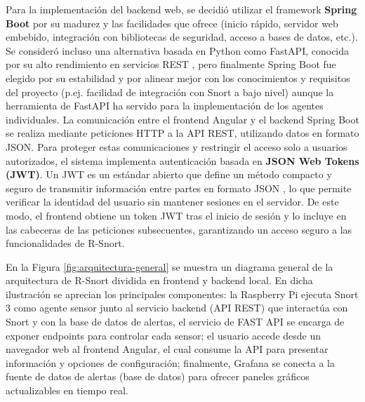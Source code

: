 \documentclass[11pt,a4paper,twoside]{report}
\begin{document}
Para la implementación del backend web, se decidió utilizar el framework \textbf{Spring Boot} por su madurez y las facilidades que ofrece (inicio rápido, servidor web embebido, integración con bibliotecas de seguridad, acceso a bases de datos, etc.). Se consideró incluso una alternativa basada en Python como FastAPI, conocida por su alto rendimiento en servicios REST \cite{FastAPI}, pero finalmente Spring Boot fue elegido por su estabilidad y por alinear mejor con los conocimientos y requisitos del proyecto (p.ej. facilidad de integración con Snort a bajo nivel) aunque la herramienta de FastAPI ha servido para la implementación de los agentes individuales. La comunicación entre el frontend Angular y el backend Spring Boot se realiza mediante peticiones HTTP a la API REST, utilizando datos en formato JSON. Para proteger estas comunicaciones y restringir el acceso solo a usuarios autorizados, el sistema implementa autenticación basada en \textbf{JSON Web Tokens (JWT)}. Un JWT es un estándar abierto que define un método compacto y seguro de transmitir información entre partes en formato JSON \cite{JWT}, lo que permite verificar la identidad del usuario sin mantener sesiones en el servidor. De este modo, el frontend obtiene un token JWT tras el inicio de sesión y lo incluye en las cabeceras de las peticiones subsecuentes, garantizando un acceso seguro a las funcionalidades de R-Snort.\newline

En la Figura \ref{fig:arquitectura-general} se muestra un diagrama general de la arquitectura de R-Snort dividida en frontend y backend local. En dicha ilustración se aprecian los principales componentes: la Raspberry Pi ejecuta Snort 3 como agente sensor junto al servicio backend (API REST) que interactúa con Snort y con la base de datos de alertas, el servicio de FAST API se encarga de exponer endpoints para controlar cada sensor; el usuario accede desde un navegador web al frontend Angular, el cual consume la API para presentar información y opciones de configuración; finalmente, Grafana se conecta a la fuente de datos de alertas (base de datos) para ofrecer paneles gráficos actualizables en tiempo real.\newline
\end{document}
